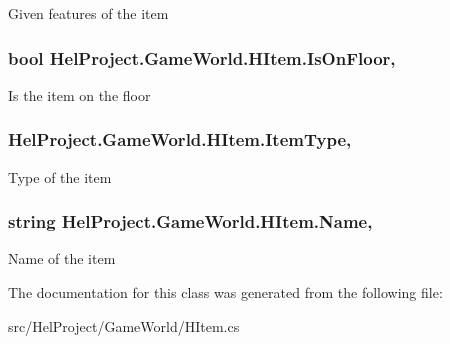 Given features of the item 

\hypertarget{class_hel_project_1_1_game_world_1_1_h_item_a5fd0a52b0f490f80d0c7abec4b3293c5}{}
\subsubsection[{Is\+On\+Floor}]{\setlength{\rightskip}{0pt plus 5cm}bool Hel\+Project.\+Game\+World.\+H\+Item.\+Is\+On\+Floor\hspace{0.3cm}{\ttfamily [get]}, {\ttfamily [set]}}\label{class_hel_project_1_1_game_world_1_1_h_item_a5fd0a52b0f490f80d0c7abec4b3293c5}


Is the item on the floor 

\hypertarget{class_hel_project_1_1_game_world_1_1_h_item_aeeb877e7d0f3aa3adf04c17c67bb385f}{}
\subsubsection[{Item\+Type}]{ Hel\+Project.\+Game\+World.\+H\+Item.\+Item\+Type\hspace{0.3cm}{\ttfamily [get]}, {\ttfamily [set]}}\label{class_hel_project_1_1_game_world_1_1_h_item_aeeb877e7d0f3aa3adf04c17c67bb385f}


Type of the item 

\hypertarget{class_hel_project_1_1_game_world_1_1_h_item_ad6e286a2833c7a01297544008e6e9e67}{}
\subsubsection[{Name}]{\setlength{\rightskip}{0pt plus 5cm}string Hel\+Project.\+Game\+World.\+H\+Item.\+Name\hspace{0.3cm}{\ttfamily [get]}, {\ttfamily [set]}}\label{class_hel_project_1_1_game_world_1_1_h_item_ad6e286a2833c7a01297544008e6e9e67}


Name of the item 



The documentation for this class was generated from the following file\+:\begin{DoxyCompactItemize}
\item 
src/\+Hel\+Project/\+Game\+World/H\+Item.\+cs\end{DoxyCompactItemize}
